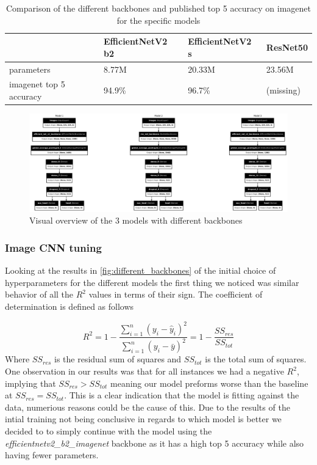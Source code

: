 \documentclass[12pt,a4paper,oneside]{article}
\begin{document}
\begin{table}[!h]
    \centering
    \begin{tabular}{@{}llll@{}}
    \toprule
    & EfficientNetV2 b2 & EfficientNetV2 s & ResNet50 \\ \midrule
    parameters              & 8.77M             & 20.33M           & 23.56M   \\
    imagenet top 5 accuracy & 94.9\%            & 96.7\%           & (missing)       \\ \bottomrule
\end{tabular}
\caption{Comparison of the different backbones and published top 5 accuracy on imagenet for the specific models}
\label{tab:backbone_comparison}
\end{table}

\begin{figure}[!h]
    \centering
    \includegraphics[width=1\textwidth]{assets/different_models.png}
    \caption{Visual overview of the 3 models with different backbones}
    \label{fig:models_overview}
\end{figure}

\subsubsection{Image CNN tuning}

Looking at the results in \ref{fig:different_backbones} of the initial choice of hyperparameters for the different models the first thing we noticed was similar behavior of all the $R^2$ values in terms of their sign. The coefficient of determination is defined as follows 

\[
    R^2 = 1 - \frac{\sum_{i=1}^{n} (y_i - \hat{y}_i)^2}{\sum_{i=1}^{n} (y_i - \bar{y})^2} = 1 - \frac{SS_{res}}{SS_{tot}}  
\]
Where $SS_{res}$ is the residual sum of squares and $SS_{tot}$ is the total sum of squares. One observation in our results was that for all instances we had a negative $R^2$, implying that $SS_{res} > SS_{tot}$ meaning our model preforms worse than the baseline at $SS_{res} = SS_{tot}$. This is a clear indication that the model is fitting against the data, numerious reasons could be the cause of this. Due to the results of the intial training not being conclusive in regards to which model is better we decided to to simply continue with the model using the \textit{efficientnetv2\_b2\_imagenet} backbone as it has a high top 5 accuracy while also having fewer parameters.
\end{document}
